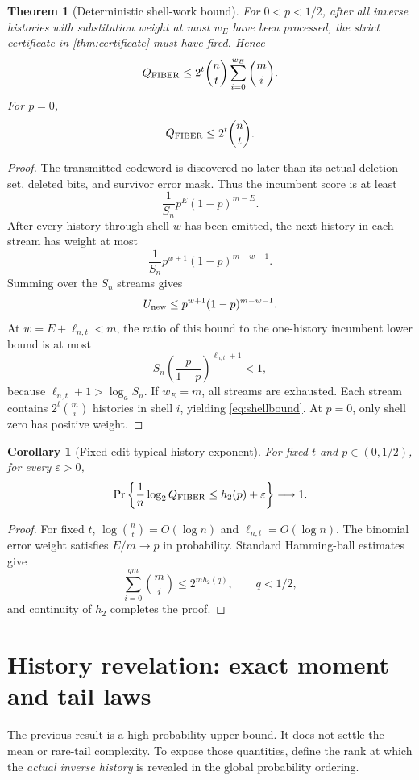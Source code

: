\documentclass[11pt]{article}
\newtheorem{theorem}{Theorem}
\newtheorem{corollary}{Corollary}
\theoremstyle{definition}
\theoremstyle{remark}
\newcommand{\Qfib}{Q_{\rm FIBER}}
\newcommand{\hbin}{h_2}
\newcommand{\eps}{\varepsilon}
\begin{document}
\begin{theorem}[Deterministic shell-work bound]
\label{thm:shell}
For $0<p<1/2$, after all inverse histories with substitution weight at most $w_E$ have been processed, the strict certificate in \cref{thm:certificate} must have fired.  Hence
\begin{equation}
\Qfib\le 2^t\binom nt\sum_{i=0}^{w_E}\binom mi.
\label{eq:shellbound}
\end{equation}
For $p=0$,
\[
\Qfib\le 2^t\binom nt.
\]
\end{theorem}
\begin{proof}
The transmitted codeword is discovered no later than its actual deletion set, deleted bits, and survivor error mask.  Thus the incumbent score is at least
\[
\frac1{S_n}p^E(1-p)^{m-E}.
\]
After every history through shell $w$ has been emitted, the next history in each stream has weight at most
\[
\frac1{S_n}p^{w+1}(1-p)^{m-w-1}.
\]
Summing over the $S_n$ streams gives
\[
U_{\rm new}\le p^{w+1}(1-p)^{m-w-1}.
\]
At $w=E+\ell_{n,t}<m$, the ratio of this bound to the one-history incumbent lower bound is at most
\[
S_n\left(\frac{p}{1-p}\right)^{\ell_{n,t}+1}<1,
\]
because $\ell_{n,t}+1>\log_a S_n$.  If $w_E=m$, all streams are exhausted.  Each stream contains $2^t\binom mi$ histories in shell $i$, yielding \eqref{eq:shellbound}.  At $p=0$, only shell zero has positive weight.
\end{proof}

\begin{corollary}[Fixed-edit typical history exponent]
\label{cor:typical}
For fixed $t$ and $p\in(0,1/2)$, for every $\eps>0$,
\[
\Pr\left\{\frac1n\log_2\Qfib\le \hbin(p)+\eps\right\}\longrightarrow1.
\]
\end{corollary}
\begin{proof}
For fixed $t$, $\log\binom nt=O(\log n)$ and $\ell_{n,t}=O(\log n)$.  The binomial error weight satisfies $E/m\to p$ in probability.  Standard Hamming-ball estimates give
\[
\sum_{i=0}^{qm}\binom mi\le 2^{m\hbin(q)},\qquad q<1/2,
\]
and continuity of $\hbin$ completes the proof.
\end{proof}

\section{History revelation: exact moment and tail laws}
The previous result is a high-probability upper bound.  It does not settle the mean or rare-tail complexity.  To expose those quantities, define the rank at which the \emph{actual inverse history} is revealed in the global probability ordering.
\end{document}
